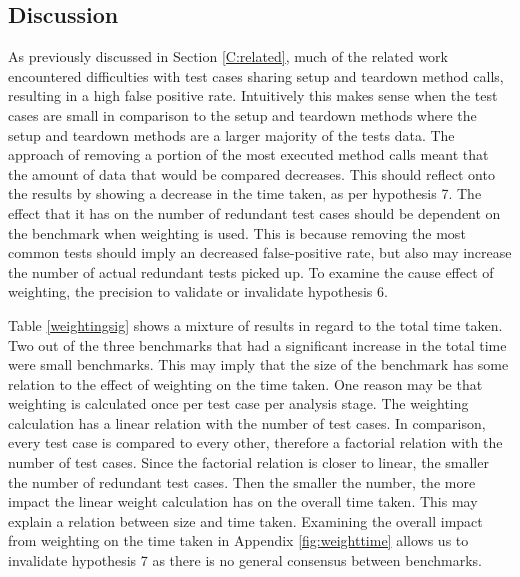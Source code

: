 \subsection{Discussion}
As previously discussed in Section \ref{C:related}, much of the related work encountered difficulties with test cases sharing setup and teardown method calls, resulting in a high false positive rate. Intuitively this makes sense when the test cases are small in comparison to the setup and teardown methods where the setup and teardown methods are a larger majority of the tests data. The approach of removing a portion of the most executed method calls meant that the amount of data that would be compared decreases. This should reflect onto the results by showing a decrease in the time taken, as per hypothesis 7. The effect that it has on the number of redundant test cases should be dependent on the benchmark when weighting is used. This is because removing the most common tests should imply an decreased false-positive rate, but also may increase the number of actual redundant tests picked up. To examine the cause effect of weighting, the precision to validate or invalidate hypothesis 6.

Table \ref{weightingsig} shows a mixture of results in regard to the total time taken. Two out of the three benchmarks that had a significant increase in the total time were small benchmarks. This may imply that the size of the benchmark has some relation to the effect of weighting on the time taken. One reason may be that weighting is calculated once per test case per analysis stage. The weighting calculation has a linear relation with the number of test cases. In comparison, every test case is compared to every other, therefore a factorial relation with the number of test cases. Since the factorial relation is closer to linear, the smaller the number of redundant test cases. Then the smaller the number, the more impact the linear weight calculation has on the overall time taken. This may explain a relation between size and time taken. Examining the overall impact from weighting on the time taken in Appendix \ref{fig:weighttime} allows us to invalidate hypothesis 7 as there is no general consensus between benchmarks.


